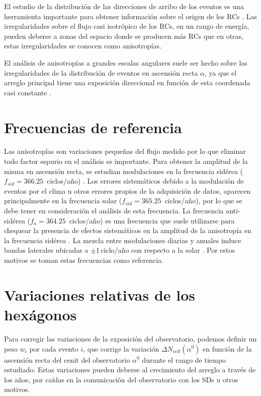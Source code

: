 El estudio de la distribución de las direcciones de arribo de los eventos es una herramienta importante para obtener información sobre el origen de los RCs . Las irregularidades sobre el flujo casi isotrópico de los RCs, en un rango de energía, pueden deberse a  zonas del espacio donde se producen más RCs que en otras, estas irregularidades se conocen como anisotropías. 

El análisis de anisotropías a grandes escalas angulares suele ser hecho sobre las irregularidades de la distribución de eventos en ascensión recta $\alpha$, ya que el arreglo principal tiene una exposición direccional en función de esta coordenada casi constante \cite{referencia_anis}.

\section{Frecuencias de referencia}

Las anisotropías son variaciones pequeñas del flujo medido por lo que eliminar todo factor espurio en el análisis es importante. Para obtener la amplitud de la misma en ascensión recta, se estudian modulaciones en la frecuencia sidérea ($f_{sid}=366.25\,$ ciclos/año) \cite{taborda}. Los errores sistemáticos debido a la modulación de eventos por el clima u otros errores propios de la adquisición de datos, aparecen principalmente en la frecuencia solar  ($f_{sid}=365.25\,$ ciclos/año), por lo que se debe tener en consideración el análisis de esta frecuencia. La frecuencia anti-sidérea ($f_a=364.25\,$ ciclos/año) es una frecuencia que suele utilizarse para chequear la presencia de efectos sistemáticos en la amplitud de la anisotropía en la frecuencia sidérea \cite{farley1954sidereal}. La mezcla entre modulaciones diarias y anuales induce bandas laterales ubicadas a $\pm1\,$ciclo/año con respecto a la solar \cite{taborda}. Por estos motivos se toman estas frecuencias  como referencia.

\section{Variaciones relativas de los hexágonos} \label{peso_hexagonos}

Para corregir las variaciones de la exposición del observatorio, podemos definir un peso  $w_i$ por cada evento $i$, que corrige la variación  $\Delta N_{cell}(\alpha^0)$ en función de la ascensión recta del cenit del observatorio $\alpha^0$ durante el rango de tiempo estudiado. Estas variaciones pueden deberse al crecimiento del arreglo a través de los años,  por caídas en la comunicación del observatorio con los SDs u otros motivos. 

